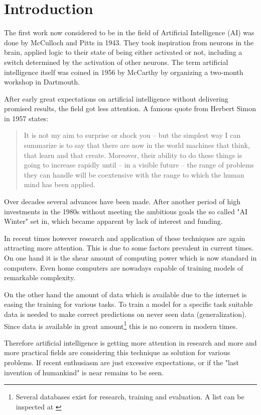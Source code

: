 \section{Introduction}

The first work now considered to be in the field of Artificial Intelligence (AI) was done by McCulloch and Pitts in 1943\cite{McCulloch1943}.
They took inspiration from neurons in the brain, applied logic to their state of being either activated or not, including a switch determined by the activation of other neurons.
The term artificial intelligence itself was coined in 1956 by McCarthy by organizing a two-month workshop in Dartmouth\cite{McCarthy1955}.

After early great expectations on artificial intelligence without delivering promised results, the field got less attention.
A famous quote from Herbert Simon in 1957 states: 
\begin{quotation}
    It is not my aim to surprise or shock you – but the simplest way I can summarize is to say that there are now in the world machines that think, that learn and that create. Moreover, their ability to do these things is going to increase rapidly until – in a visible future – the range of problems they can handle will be coextensive with the range to which the human mind has been applied.
\end{quotation}

Over decades several advances have been made.
After another period of high investments in the 1980s without meeting the ambitious goals the so called "AI Winter" set in, which became apparent by lack of interest and funding.

In recent times however research and application of these techniques are again attracting more attention.
This is due to some factors prevalent in current times.
On one hand it is the shear amount of computing power which is now standard in computers.
Even home computers are nowadays capable of training models of remarkable complexity.

On the other hand the amount of data which is available due to the internet is easing the training for various tasks.
To train a model for a specific task suitable data is needed to make correct predictions on never seen data (generalization).
Since data is available in great amount\footnote{Several databases exist for research, training and evaluation.
A list can be inspected at \cite{Wikipedia2019}} this is no concern in modern times.

Therefore artificial intelligence is getting more attention in research and more and more practical fields are considering this technique as solution for various problems.
If recent enthusiasm are just excessive expectations, or if the "last invention of humankind"\cite{Good1965} is near remains to be seen.

